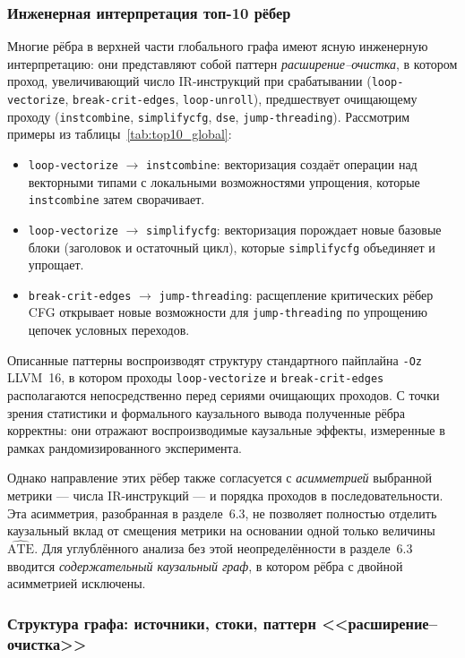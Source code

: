 \subsubsection{Инженерная интерпретация топ-10 рёбер}

Многие рёбра в верхней части глобального графа имеют ясную инженерную интерпретацию: они представляют собой паттерн \emph{расширение--очистка}, в котором проход, увеличивающий число IR-инструкций при срабатывании (\texttt{loop-vectorize}, \texttt{break-crit-edges}, \texttt{loop-unroll}), предшествует очищающему проходу (\texttt{instcombine}, \texttt{simplifycfg}, \texttt{dse}, \texttt{jump-threading}). Рассмотрим примеры из таблицы~\ref{tab:top10_global}:

\begin{itemize}
    \item \texttt{loop-vectorize} $\to$ \texttt{instcombine}: векторизация создаёт операции над векторными типами с локальными возможностями упрощения, которые \texttt{instcombine} затем сворачивает.
    \item \texttt{loop-vectorize} $\to$ \texttt{simplifycfg}: векторизация порождает новые базовые блоки (заголовок и остаточный цикл), которые \texttt{simplifycfg} объединяет и упрощает.
    \item \texttt{break-crit-edges} $\to$ \texttt{jump-threading}: расщепление критических рёбер CFG открывает новые возможности для \texttt{jump-threading} по упрощению цепочек условных переходов.
\end{itemize}

Описанные паттерны воспроизводят структуру стандартного пайплайна \texttt{-Oz} LLVM~16, в котором проходы \texttt{loop-vectorize} и \texttt{break-crit-edges} располагаются непосредственно перед сериями очищающих проходов. С точки зрения статистики и формального каузального вывода полученные рёбра корректны: они отражают воспроизводимые каузальные эффекты, измеренные в рамках рандомизированного эксперимента.

Однако направление этих рёбер также согласуется с \emph{асимметрией} выбранной метрики --- числа IR-инструкций --- и порядка проходов в последовательности. Эта асимметрия, разобранная в разделе~6.3, не позволяет полностью отделить каузальный вклад от смещения метрики на основании одной только величины $\widehat{\text{ATE}}$. Для углублённого анализа без этой неопределённости в разделе~6.3 вводится \emph{содержательный каузальный граф}, в котором рёбра с двойной асимметрией исключены.

\subsubsection{Структура графа: источники, стоки, паттерн <<расширение--очистка>>}

